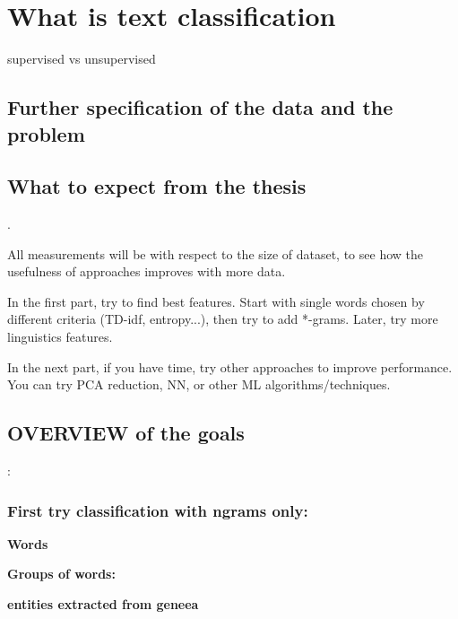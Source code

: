\chapter{What is text classification}

supervised vs unsupervised

\section{Further specification of the data and the problem}

\section{What to expect from the thesis}

.

All measurements will be with respect to the size of dataset, to see how the usefulness of approaches improves with more data.

In the first part, try to find best features. Start with single words chosen by different
criteria (TD-idf, entropy...), then try to add *-grams. Later, try more linguistics features.

In the next part, if you have time, try other approaches to improve performance. You can try PCA reduction, NN, or other ML algorithms/techniques.

\section{OVERVIEW of the goals}:

\subsection{First try classification with ngrams only:}

\bf Words \rm





\bf Groups of words: \rm

\bf entities extracted from geneea \rm


